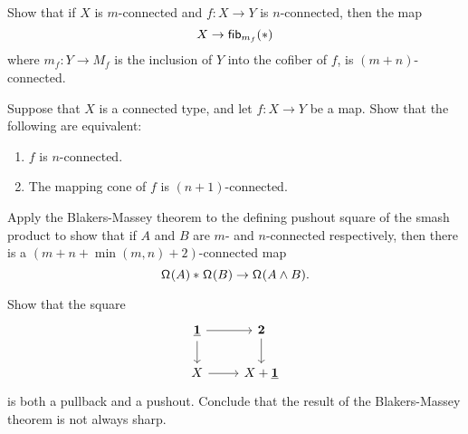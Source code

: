 \begin{exercises}
\item Show that if $X$ is $m$-connected and $f:X\to Y$ is $n$-connected, then the map
\begin{equation*}
X \to \mathsf{fib}_{m_f}(\ast)
\end{equation*}
where $m_f:Y\to M_f$ is the inclusion of $Y$ into the cofiber of $f$, is $(m+n)$-connected.
\item Suppose that $X$ is a connected type, and let $f:X\to Y$ be a map.
Show that the following are equivalent:
\begin{enumerate}
\item $f$ is $n$-connected.
\item The mapping cone of $f$ is $(n+1)$-connected.
\end{enumerate}
\item Apply the Blakers-Massey theorem to the defining pushout square of the smash product to show that if $A$ and $B$ are $m$- and $n$-connected respectively, then there is a $(m+n+\min(m,n)+2)$-connected map
\begin{equation*}
{\mathsf{\Omega}^{}(A)}\ast_{}{\mathsf{\Omega}^{}(B)}\to \mathsf{\Omega}^{}(A \wedge B).
\end{equation*}
\item Show that the square
\begin{equation*}
\begin{tikzcd}
\unit \arrow[r] \arrow[d] & \bool \arrow[d] \\
X \arrow[r] & X+\unit
\end{tikzcd}
\end{equation*}
is both a pullback and a pushout. Conclude that the result of the Blakers-Massey theorem is not always sharp.
\end{exercises}
